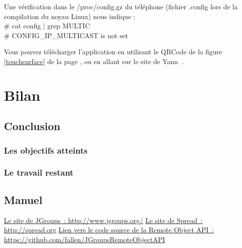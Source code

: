 \documentclass[a4paper,10pt]{report}
\begin{document}
Une vérification dans le /proc/config.gz du téléphone (fichier .config lors de la compilation du noyau Linux) nous indique : \\
\# cat config $|$ grep MULTIC\\
\# CONFIG\_IP\_MULTICAST is not set

Vous pouvez télécharger l'application en utilisant le QRCode de la figure \ref{touchsurface} de la page \pageref{touchsurface}, ou en allant sur le site de Yann~\cite{site_yann}.

\part{Bilan}

\chapter{Conclusion}

\section{Les objectifs atteints}

\section{Le travail restant}

\chapter{Manuel}


\listoffigures

\begin{thebibliography}{99}
   \href{http://www.jgroups.org/}{Le site de JGroups~: http://www.jgroups.org/}
   \href{http://spread.org}{Le site de Spread~: http://spread.org}
   \href{https://github.com/fallen/JGroupsRemoteObjectAPI}{Lien vers le code source de la Remote Object API~: https://github.com/fallen/JGroupsRemoteObjectAPI}
\end{thebibliography}
\end{document}

